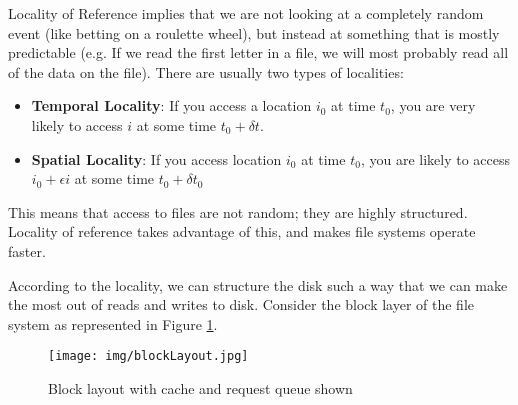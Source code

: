 \documentclass[a4paper]{article}
\begin{document}
Locality of Reference implies that we are not looking at a completely random event (like betting on a roulette wheel), but instead at something that is mostly predictable (e.g. If we read the first letter in a file, we will most probably read all of the data on the file). There are usually two types of localities:
\begin{itemize}
\item \textbf{Temporal Locality}: If you access a location $i_0$ at time $t_0$, you are very likely to access $i$ at some time $t_0+\delta t$. 
\item \textbf{Spatial Locality}: If you access location $i_0$ at time $t_0$, you are likely to access $i_0+\epsilon i$ at some time $t_0 + \delta t_0$
\end{itemize}
This means that access to files are not random; they are highly structured. Locality of reference takes advantage of this, and makes file systems operate faster.

According to the locality, we can structure the disk such a way that we can make the most out of reads and writes to disk. Consider the block layer of the file system as represented in Figure \ref{fig:BlockLayout}.

\begin{figure}
\centering
\texttt{[image: img/blockLayout.jpg]}
\caption{\label{fig:BlockLayout}Block layout with cache and request queue shown}
\end{figure}
\end{document}
